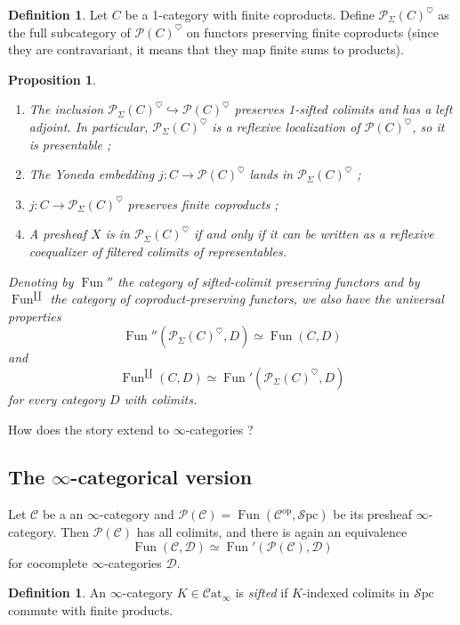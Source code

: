 \documentclass[11pt]{article}
\newtheorem{proposition}[theorem]{Proposition}
\theoremstyle{definition}
\newtheorem{definition}[theorem]{Definition}
\newcommand{\C}{\mathcal{C}}
\newcommand{\Catinf}{\mathcal{C}\mathrm{at}_{\infty}}
\newcommand{\D}{\mathcal{D}}
\newcommand{\Fun}{\operatorname{Fun}}
\newcommand{\heart}{\heartsuit}
\newcommand{\op}{\mathrm{op}}
\renewcommand{\P}{\mathcal{P}}
\newcommand{\Spc}{\mathcal{S}\mathrm{pc}}
\begin{document}
\begin{definition}
    Let $C$ be a 1-category with finite coproducts.
    Define $\P_{\Sigma}(C)^{\heart}$ as the full subcategory of $\P(C)^{\heart}$ on functors preserving finite coproducts (since they are contravariant, it means that they map finite sums to products).
\end{definition}

\begin{proposition}
    \begin{enumerate}
        \item The inclusion $\P_{\Sigma}(C)^{\heart} \hookrightarrow \P(C)^{\heart}$ preserves 1-sifted colimits and has a left adjoint.
        In particular, $\P_{\Sigma}(C)^{\heart}$ is a reflexive localization of $\P(C)^{\heart}$, so it is presentable ;
        \item The Yoneda embedding $j : C \to \P(C)^{\heart}$ lands in $\P_{\Sigma}(C)^{\heart}$ ;
        \item $j : C \to \P_{\Sigma}(C)^{\heart}$ preserves finite coproducts ;
        \item A presheaf $X$ is in $\P_{\Sigma}(C)^{\heart}$ if and only if it can be written as a reflexive coequalizer of filtered colimits of representables.
    \end{enumerate}
    Denoting by $\Fun''$ the category of sifted-colimit preserving functors and by $\Fun^{\amalg}$ the category of coproduct-preserving functors, we also have the universal properties
    \[
        \Fun''(\P_{\Sigma}(C)^{\heart}, D) \simeq \Fun(C, D)
    \]
    and
    \[
        \Fun^{\amalg}(C, D) \simeq \Fun'(\P_{\Sigma}(C)^{\heart}, D)
    \]
    for every category $D$ with colimits.
\end{proposition}
How does the story extend to $\infty$-categories ?

\subsection{The $\infty$-categorical version}

Let $\C$ be a an $\infty$-category and $\P(\C) = \Fun(\C^{\op}, \Spc)$ be its presheaf $\infty$-category.
Then $\P(\C)$ has all colimits, and there is again an equivalence
\[
    \Fun(\C, \D) \simeq \Fun'(\P(\C), \D)
\]
for cocomplete $\infty$-categories $\D$.

\begin{definition}
    An $\infty$-category $K \in \Catinf$ is \emph{sifted} if $K$-indexed colimits in $\Spc$ commute with finite products.
\end{definition}
\end{document}
